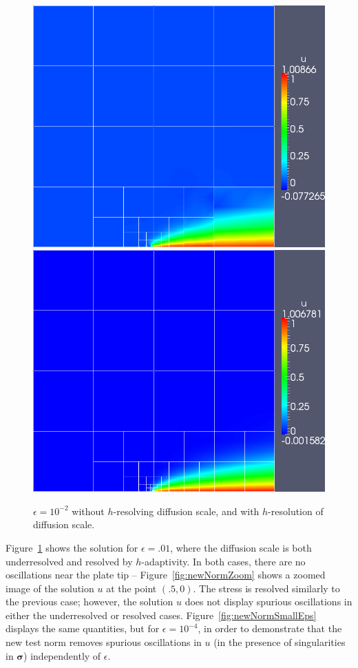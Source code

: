 \documentclass[letterpaper]{article}
\def\bfsigma{\boldsymbol\sigma}
\begin{document}
\begin{figure}[!h]
\centering
\includegraphics[scale=.275]{figs/LaplaceFigs/coupled1e2h1e2.png}
\includegraphics[scale=.275]{figs/LaplaceFigs/coupled1e2h1e3.png}
\caption{$\epsilon = 10^{-2}$ without $h$-resolving diffusion scale, and with $h$-resolution of diffusion scale.}
\label{fig:newNorm}
\end{figure}

Figure~\ref{fig:newNorm} shows the solution for $\epsilon = .01$, where the
diffusion scale is both underresolved and resolved by $h$-adaptivity.  In both
cases, there are no oscillations near the plate tip --
Figure~\ref{fig:newNormZoom} shows a zoomed image of the solution $u$ at the
point $(.5,0)$.  The stress is resolved similarly to the previous case;
however, the solution $u$ does not display spurious oscillations in either the
underresolved or resolved cases.  Figure~\ref{fig:newNormSmallEps} displays
the same quantities, but for $\epsilon = 10^{-4}$, in order to demonstrate
that the new test norm removes spurious oscillations in $u$ (in the presence
of singularities in $\bfsigma$) independently of $\epsilon$.
\end{document}
